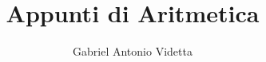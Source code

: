 \documentclass[oneside]{book}
\theoremstyle{definition}
\begin{document}
\author{Gabriel Antonio Videtta}
\title{Appunti di Aritmetica}

\maketitle
\newpage

\tableofcontents
\newpage


\end{document}
